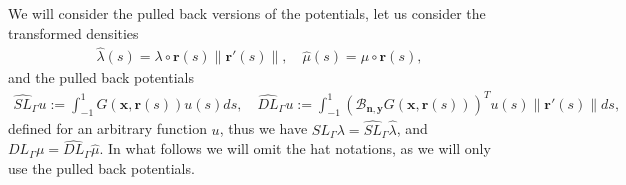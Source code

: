 \documentclass{article}
\newcommand{\bn}{\bm{n}}
\newcommand{\br}{\bm{r}}
\newcommand{\bx}{\bm{x}}
\newcommand{\by}{\bm{y}}
\begin{document}
We will consider the pulled back versions of the potentials, let us consider the transformed densities 
\begin{align*}
\widehat{\lambda} (s) = \lambda \circ \br(s)  \| \br'(s) \|, \quad 
\widehat{\mu} (s) = \mu \circ \br(s),
\end{align*}
and the pulled back potentials 
\begin{align*}
\widehat{SL}_{\Gamma} u := \int_{-1}^1 
 G(\bx,\br(s))  u(s) ds, \quad 
 \widehat{DL}_{\Gamma} u := \int_{-1}^1 
 \left(\mathcal{B}_{\bn,\by}G(\bx,\br(s))\right)^T  u(s) \|\br'(s)\|ds,
\end{align*}
defined for an arbitrary function $u$, thus we have $SL_\Gamma \lambda  = \widehat{SL}_\Gamma \widehat{\lambda}$, and $DL_\Gamma \mu  = \widehat{DL}_\Gamma \widehat{\mu}$. In what follows we will omit the hat notations, as we will only use the pulled back potentials. 
\end{document}
